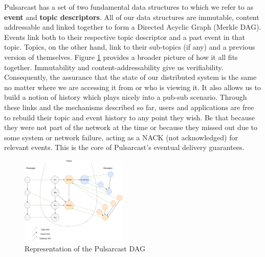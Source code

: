 Pulsarcast has a set of two fundamental data structures to which we refer to as
\textbf{event} and \textbf{topic descriptors}. All of our data structures are
immutable, content addressable and linked together to form a Directed Acyclic
Graph (Merkle DAG). Events link both to their respective topic descriptor and a
past event in that topic. Topics, on the other hand, link to their sub-topics
(if any) and a previous version of themselves. Figure \ref{fig:pulsarcast-dag}
provides a broader picture of how it all fits together. Immutability and
content-addressability give us verifiability. Consequently, the assurance that
the state of our distributed system is the same no matter where we are
accessing it from or who is viewing it. It also allows us to build a notion of
history which plays nicely into a pub-sub scenario. Through these links and the
mechanisms described so far, users and applications are free to rebuild their
topic and event history to any point they wish. Be that because they were not
part of the network at the time or because they missed out due to some system
or network failure, acting as a NACK (not acknowledged) for relevant events.
This is the core of Pulsarcast's eventual delivery guarantees.

\begin{figure}[hb!]
  \centering
  \includegraphics[width=0.45\textwidth]{../images/pulsarcast-dag.png}
  \caption{Representation of the Pulsarcast DAG}
  \label{fig:pulsarcast-dag}
\end{figure}

